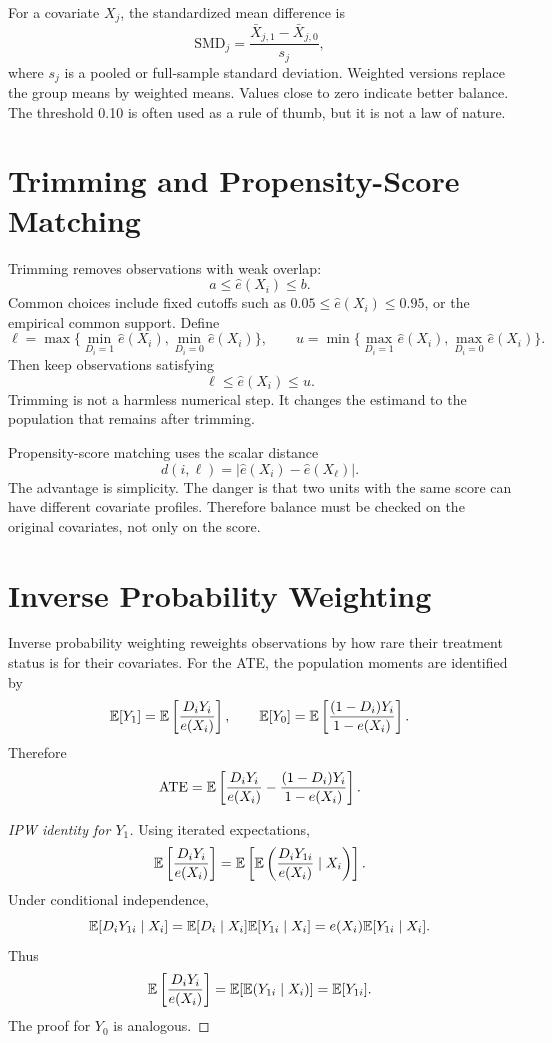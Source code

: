For a covariate \(X_j\), the standardized mean difference is
\[
    \mathrm{SMD}_j
    =
    \frac{\bar X_{j,1}-\bar X_{j,0}}{s_j},
\]
where \(s_j\) is a pooled or full-sample standard deviation. Weighted versions
replace the group means by weighted means. Values close to zero indicate better
balance. The threshold 0.10 is often used as a rule of thumb, but it is not a
law of nature.

\section{Trimming and Propensity-Score Matching}

Trimming removes observations with weak overlap:
\[
    a \leq \widehat e(X_i) \leq b.
\]
Common choices include fixed cutoffs such as \(0.05\leq \widehat e(X_i)\leq
0.95\), or the empirical common support. Define
\[
    \ell
    =
    \max\{\min_{D_i=1}\widehat e(X_i),\min_{D_i=0}\widehat e(X_i)\},
    \qquad
    u
    =
    \min\{\max_{D_i=1}\widehat e(X_i),\max_{D_i=0}\widehat e(X_i)\}.
\]
Then keep observations satisfying
\[
    \ell \leq \widehat e(X_i)\leq u.
\]
Trimming is not a harmless numerical step. It changes the estimand to the
population that remains after trimming.

Propensity-score matching uses the scalar distance
\[
    d(i,\ell)=|\widehat e(X_i)-\widehat e(X_\ell)|.
\]
The advantage is simplicity. The danger is that two units with the same score
can have different covariate profiles. Therefore balance must be checked on the
original covariates, not only on the score.

\section{Inverse Probability Weighting}

Inverse probability weighting reweights observations by how rare their
treatment status is for their covariates. For the ATE, the population moments
are identified by
\[
    \mathbb{E}[Y_1] = \mathbb{E}\left[\frac{D_iY_i}{e(X_i)}\right],
    \qquad
    \mathbb{E}[Y_0] = \mathbb{E}\left[\frac{(1-D_i)Y_i}{1-e(X_i)}\right].
\]
Therefore
\[
    \mathrm{ATE}
    =
    \mathbb{E}\left[\frac{D_iY_i}{e(X_i)}
    -
    \frac{(1-D_i)Y_i}{1-e(X_i)}\right].
\]

\begin{proof}[IPW identity for \(Y_1\)]
Using iterated expectations,
\[
    \mathbb{E}\left[\frac{D_iY_i}{e(X_i)}\right]
    =
    \mathbb{E}\left[\mathbb{E}\left(\frac{D_iY_{1i}}{e(X_i)}\mid X_i\right)\right].
\]
Under conditional independence,
\[
    \mathbb{E}[D_iY_{1i}\mid X_i]
    =
    \mathbb{E}[D_i\mid X_i]\mathbb{E}[Y_{1i}\mid X_i]
    =
    e(X_i)\mathbb{E}[Y_{1i}\mid X_i].
\]
Thus
\[
    \mathbb{E}\left[\frac{D_iY_i}{e(X_i)}\right]
    =
    \mathbb{E}[\mathbb{E}(Y_{1i}\mid X_i)]
    =
    \mathbb{E}[Y_{1i}].
\]
The proof for \(Y_0\) is analogous.
\end{proof}

